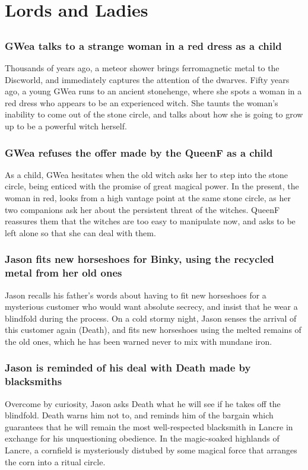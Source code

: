 \section{Lords and Ladies}


\subsection{}
\subsubsection{\Gls{GWea} talks to a strange woman in a red dress as a child}
Thousands of years ago, a meteor shower brings ferromagnetic metal to the Discworld, and immediately
captures the attention of the dwarves. Fifty years ago, a young \Gls{GWea} runs to an ancient
stonehenge, where she spots a woman in a red dress who appears to be an experienced witch. She
taunts the woman's inability to come out of the stone circle, and talks about how she is going to
grow up to be a powerful witch herself.

\subsubsection{\Gls{GWea} refuses the offer made by the \Gls{QueenF} as a child}
As a child, \Gls{GWea} hesitates when the old witch asks her to step into the stone circle, being
enticed with the promise of great magical power. In the present, the woman in red, looks from a
high vantage point at the same stone circle, as her two companions ask her about the persistent
threat of the witches. \Gls{QueenF} reassures them that the witches are too easy to manipulate now,
and asks to be left alone so that she can deal with them.

\subsubsection{\Gls{Jason} fits new horseshoes for \Gls{Binky}, using the recycled metal from her
    old ones}
\Gls{Jason} recalls his father's words about having to fit new horseshoes for a mysterious customer
who would want absolute secrecy, and insist that he wear a blindfold during the process. On a
cold stormy night, \Gls{Jason} senses the arrival of this customer again (\Gls{Death}), and fits
new horseshoes using the melted remains of the old ones, which he has been warned never to mix with
mundane iron.

\subsubsection{\Gls{Jason} is reminded of his deal with \Gls{Death} made by blacksmiths}
Overcome by curiosity, \Gls{Jason} asks \Gls{Death} what he will see if he takes off the blindfold.
\Gls{Death} warns him not to, and reminds him of the bargain which guarantees that he will remain
the most well-respected blacksmith in Lancre in exchange for his unquestioning obedience. In the
magic-soaked highlands of Lancre, a cornfield is mysteriously distubed by some magical force that
arranges the corn into a ritual circle.

